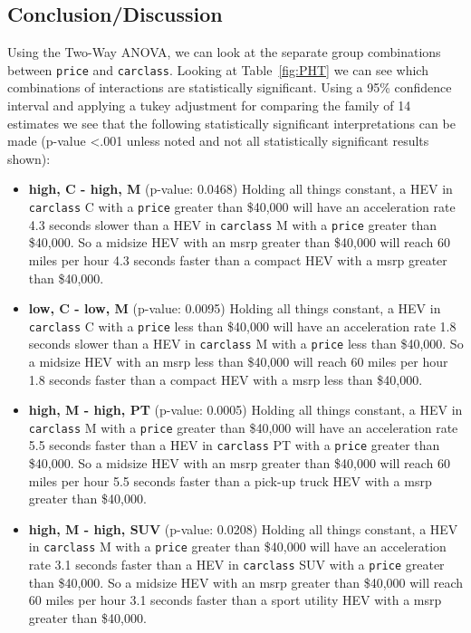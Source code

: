 \documentclass[acmsmall]{acmart}
\begin{document}
\subsection{Conclusion/Discussion}
Using the Two-Way ANOVA, we can look at the separate group combinations between \texttt{price} and \texttt{carclass}. Looking at Table~\ref{fig:PHT} we can see which combinations of interactions are statistically significant. Using a 95\% confidence interval and applying a tukey adjustment for comparing the family of 14 estimates we see that the following statistically significant interpretations can be made (p-value <.001 unless noted and not all statistically significant results shown):
\begin{itemize}
\item[] \textbf{high, C - high, M} (p-value: 0.0468) Holding all things constant, a HEV in \texttt{carclass} C with a \texttt{price} greater than \$40,000 will have an acceleration rate 4.3 seconds slower than a HEV in \texttt{carclass} M with a \texttt{price} greater than \$40,000. So a midsize HEV with an msrp greater than \$40,000 will reach 60 miles per hour 4.3 seconds faster than a compact HEV with a msrp greater than \$40,000.
\item[] \textbf{low, C - low, M} (p-value: 0.0095) Holding all things constant, a HEV in \texttt{carclass} C with a \texttt{price} less than \$40,000 will have an acceleration rate 1.8 seconds slower than a HEV in \texttt{carclass} M with a \texttt{price} less than \$40,000. So a midsize HEV with an msrp less than \$40,000 will reach 60 miles per hour 1.8 seconds faster than a compact HEV with a msrp less than \$40,000.
\item[] \textbf{high, M - high, PT} (p-value: 0.0005) Holding all things constant, a HEV in \texttt{carclass} M with a \texttt{price} greater than \$40,000 will have an acceleration rate 5.5 seconds faster than a HEV in \texttt{carclass} PT with a \texttt{price} greater than \$40,000. So a midsize HEV with an msrp greater than \$40,000 will reach 60 miles per hour 5.5 seconds faster than a pick-up truck HEV with a msrp greater than \$40,000.
\item[] \textbf{high, M - high, SUV} (p-value: 0.0208) Holding all things constant, a HEV in \texttt{carclass} M with a \texttt{price} greater than \$40,000 will have an acceleration rate 3.1 seconds faster than a HEV in \texttt{carclass} SUV with a \texttt{price} greater than \$40,000. So a midsize HEV with an msrp greater than \$40,000 will reach 60 miles per hour 3.1 seconds faster than a sport utility HEV with a msrp greater than \$40,000.

\end{itemize}
\end{document}
